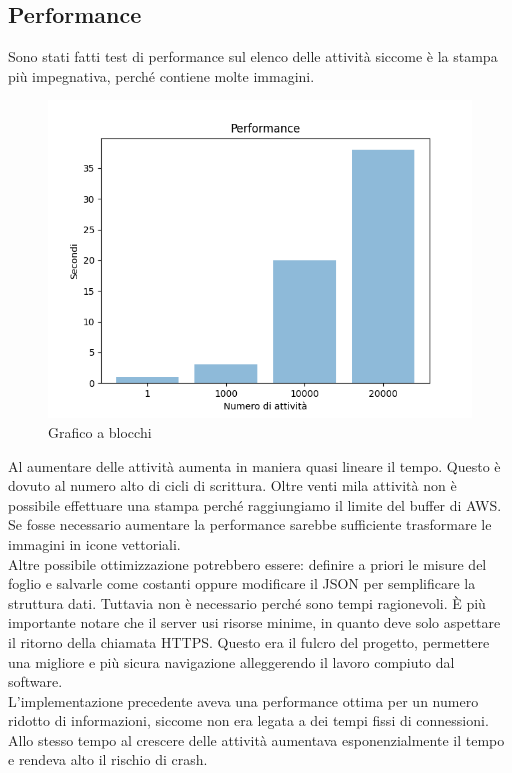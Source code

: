 \documentclass[12pt]{article}
\begin{document}
\subsection{Performance}
Sono stati fatti test di performance sul elenco delle attività siccome è la 
stampa più impegnativa, perché contiene molte immagini.  
\begin{figure}[H]
\includegraphics[width =\textwidth]{performance.png}
\caption{Grafico a blocchi}
\end{figure}
Al aumentare delle attività aumenta in maniera quasi lineare il tempo. Questo 
è dovuto al numero alto di cicli di scrittura.
Oltre venti mila attività non è possibile effettuare una stampa perché 
raggiungiamo il limite del buffer di AWS. Se fosse necessario aumentare 
la performance sarebbe sufficiente trasformare le immagini in icone vettoriali.
\\ Altre possibile ottimizzazione potrebbero essere: definire a priori le 
misure del foglio e salvarle come costanti oppure modificare il JSON per 
semplificare la struttura dati. 
Tuttavia non è necessario perché sono tempi ragionevoli.
È più importante notare che il server usi risorse minime, in quanto deve 
solo aspettare il ritorno della chiamata HTTPS. Questo era il fulcro del progetto, 
permettere una migliore e più sicura navigazione alleggerendo il lavoro compiuto 
dal software.
\\ L'implementazione precedente aveva una performance ottima per un numero ridotto 
di informazioni, 
siccome non era legata a dei tempi fissi di connessioni. Allo stesso tempo al 
crescere delle attività aumentava esponenzialmente il tempo e rendeva alto il 
rischio di crash.
\end{document}
